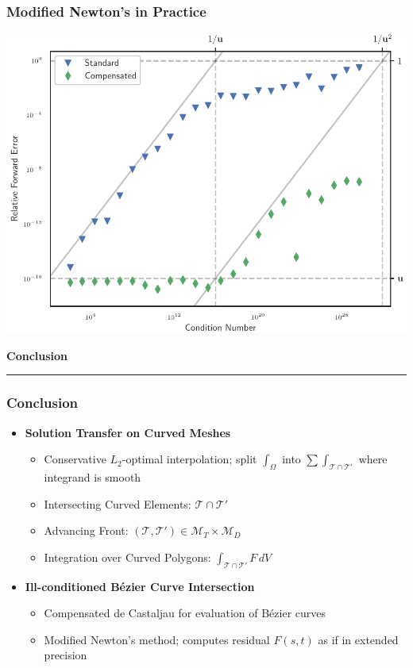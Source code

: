 \documentclass{beamer}
\begin{document}
\begin{frame}
\frametitle{Modified Newton's in Practice}
\begin{center}
\includegraphics[height=0.8\textheight]
                {../images/compensated-newton/almost_tangent.pdf}
\end{center}
\end{frame}


\begin{frame}
\centering
{\Large \bf Conclusion}
\rule{0.82\textwidth}{1pt}
\end{frame}

\begin{frame}
\frametitle{Conclusion}
\begin{itemize}
\pause
\item \textbf{Solution Transfer on Curved Meshes}
\begin{itemize}
\pause
\item Conservative \(L_2\)-optimal interpolation; split
  \(\displaystyle \int_{\Omega}\) into \(\displaystyle \sum \int_{\mathcal{T}
  \cap \mathcal{T}'}\) where integrand is smooth
\pause
\item Intersecting Curved Elements: \(\mathcal{T} \cap \mathcal{T}'\)
\pause
\item Advancing Front: \(\left(\mathcal{T}, \mathcal{T}'\right) \in
  \mathcal{M}_T \times \mathcal{M}_D\)
\pause
\item Integration over Curved Polygons:
  \(\displaystyle \int_{\mathcal{T} \cap \mathcal{T}'} F \, dV\)
\end{itemize}
\pause
\item \textbf{Ill-conditioned B\'{e}zier Curve Intersection}
\begin{itemize}
\pause
\item Compensated de Castaljau for evaluation of B\'{e}zier curves
\pause
\item Modified Newton's method; computes residual \(F(s, t)\) as
  if in extended precision
\end{itemize}
\end{itemize}
\end{frame}
\end{document}
